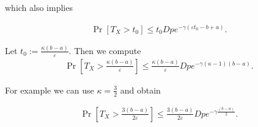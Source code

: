 \documentclass[12pt, a4paper]{article}
\theoremstyle{remark}
\begin{document}
which also implies

\begin{align*}
    \Pr[T_X > t_0] \leq t_0 D p e^{-\gamma(\varepsilon t_0 - b + a)}.
\end{align*}

Let $t_0 := \frac{\kappa (b - a)}{\varepsilon}$. Then we compute
\begin{align*}
    \Pr\left[T_X > \frac{\kappa (b - a)}{\varepsilon}\right] \leq \frac{\kappa (b - a)}{\varepsilon} D p e^{-\gamma(\kappa - 1)(b - a)}.
\end{align*}

For example we can use $\kappa = \frac{3}{2}$ and obtain

\begin{align*}
    \Pr\left[T_X > \frac{3 (b - a)}{2\varepsilon}\right] \leq \frac{3(b - a)}{2\varepsilon} D p e^{-\gamma\frac{(b - a)}{2}}.
\end{align*}











\end{document}

